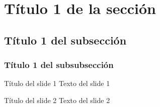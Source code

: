 \section{Título 1 de la sección}

\subsection{Título 1 del subsección}

\subsubsection{Título 1 del subsubsección}

\begin{frame}{Título del slide 1}
	Texto del slide 1
\end{frame}
\begin{frame}{Título del slide 2}
	Texto del slide 2
\end{frame}
